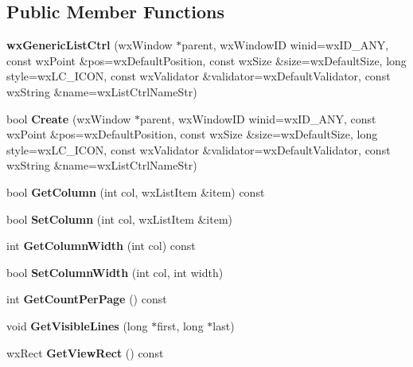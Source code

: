 \subsection*{Public Member Functions}
\begin{DoxyCompactItemize}
\item 
{\bfseries wxGenericListCtrl} (wxWindow $\ast$parent, wxWindowID winid=wxID\_\-ANY, const wxPoint \&pos=wxDefaultPosition, const wxSize \&size=wxDefaultSize, long style=wxLC\_\-ICON, const wxValidator \&validator=wxDefaultValidator, const wxString \&name=wxListCtrlNameStr)\label{classMuleExtern_1_1wxGenericListCtrl_aed4a87fda663760fe5a578b3e1043d36}

\item 
bool {\bfseries Create} (wxWindow $\ast$parent, wxWindowID winid=wxID\_\-ANY, const wxPoint \&pos=wxDefaultPosition, const wxSize \&size=wxDefaultSize, long style=wxLC\_\-ICON, const wxValidator \&validator=wxDefaultValidator, const wxString \&name=wxListCtrlNameStr)\label{classMuleExtern_1_1wxGenericListCtrl_ad5a84184c198656cd80d457855b3dcb4}

\item 
bool {\bfseries GetColumn} (int col, wxListItem \&item) const \label{classMuleExtern_1_1wxGenericListCtrl_a4f545195da15cf971f1f951d5592244f}

\item 
bool {\bfseries SetColumn} (int col, wxListItem \&item)\label{classMuleExtern_1_1wxGenericListCtrl_a60791c0b3026648d6f6a58ab7abc4670}

\item 
int {\bfseries GetColumnWidth} (int col) const \label{classMuleExtern_1_1wxGenericListCtrl_ab43d0b120af9b83d6b27b3fa4458e346}

\item 
bool {\bfseries SetColumnWidth} (int col, int width)\label{classMuleExtern_1_1wxGenericListCtrl_a3f3f67087c56551d349df264b253f36f}

\item 
int {\bfseries GetCountPerPage} () const \label{classMuleExtern_1_1wxGenericListCtrl_a99f346710cf7a37ab0148d6c7dfbcdc6}

\item 
void {\bfseries GetVisibleLines} (long $\ast$first, long $\ast$last)\label{classMuleExtern_1_1wxGenericListCtrl_a5696c874f6ca7968a35fdbb9c7032eb9}

\item 
wxRect {\bfseries GetViewRect} () const \label{classMuleExtern_1_1wxGenericListCtrl_a7d37038b939b3c98d08370cea849fe43}


\end{DoxyCompactItemize}
